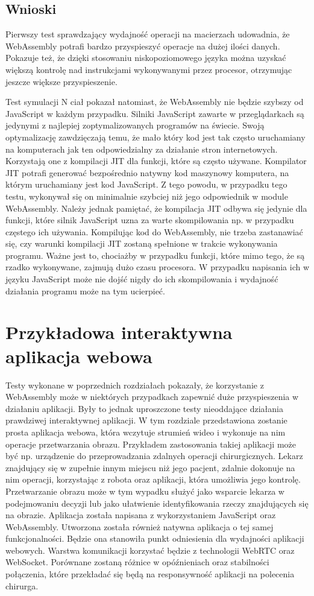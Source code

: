 \documentclass[language=polish,type=master]{aghmodern}
\begin{document}
\section{Wnioski}
Pierwszy test sprawdzający wydajność operacji na macierzach udowadnia, że WebAssembly potrafi bardzo przyspieszyć operacje na dużej ilości danych.
Pokazuje też, że dzięki stosowaniu niskopoziomowego języka można uzyskać większą kontrolę nad instrukcjami wykonywanymi przez procesor, otrzymując jeszcze większe przyspieszenie.

Test symulacji N ciał pokazał natomiast, że WebAssembly nie będzie szybszy od JavaScript w każdym przypadku.
Silniki JavaScript zawarte w przeglądarkach są jedynymi z najlepiej zoptymalizowanych programów na świecie.
Swoją optymalizację zawdzięczają temu, że mało który kod jest tak często uruchamiany na komputerach jak ten odpowiedzialny za działanie stron internetowych.
Korzystają one z kompilacji JIT dla funkcji, które są często używane.
Kompilator JIT potrafi generować bezpośrednio natywny kod maszynowy komputera, na którym uruchamiany jest kod JavaScript.
Z tego powodu, w przypadku tego testu, wykonywał się on minimalnie szybciej niż jego odpowiednik w module WebAssembly.
Należy jednak pamiętać, że kompilacja JIT odbywa się jedynie dla funkcji, które silnik JavaScript uzna za warte skompilowania np. w przypadku częstego ich używania.
Kompilując kod do WebAssembly, nie trzeba zastanawiać się, czy warunki kompilacji JIT zostaną spełnione w trakcie wykonywania programu.
Ważne jest to, chociażby w przypadku funkcji, które mimo tego, że są rzadko wykonywane, zajmują dużo czasu procesora.
W przypadku napisania ich w języku JavaScript może nie dojść nigdy do ich skompilowania i wydajność działania programu może na tym ucierpieć.

\chapter{Przykładowa interaktywna aplikacja webowa}
Testy wykonane w poprzednich rozdziałach pokazały, że korzystanie z WebAssembly może w niektórych przypadkach zapewnić duże przyspieszenia w działaniu aplikacji.
Były to jednak uproszczone testy nieoddające działania prawdziwej interaktywnej aplikacji.
W tym rozdziale przedstawiona zostanie prosta aplikacja webowa, która wczytuje strumień wideo i wykonuje na nim operacje przetwarzania obrazu.
Przykładem zastosowania takiej aplikacji może być np. urządzenie do przeprowadzania zdalnych operacji chirurgicznych.
Lekarz znajdujący się w zupełnie innym miejscu niż jego pacjent, zdalnie dokonuje na nim operacji, korzystając z robota oraz aplikacji, która umożliwia jego kontrolę.
Przetwarzanie obrazu może w tym wypadku służyć jako wsparcie lekarza w podejmowaniu decyzji lub jako ułatwienie identyfikowania rzeczy znajdujących się na obrazie.
Aplikacja została napisana z wykorzystaniem JavaScript oraz WebAssembly.
Utworzona została również natywna aplikacja o tej samej funkcjonalności.
Będzie ona stanowiła punkt odniesienia dla wydajności aplikacji webowych.
Warstwa komunikacji korzystać będzie z technologii WebRTC oraz WebSocket.
Porównane zostaną różnice w opóźnieniach oraz stabilności połączenia, które przekładać się będą na responsywność aplikacji na polecenia chirurga.
\end{document}

